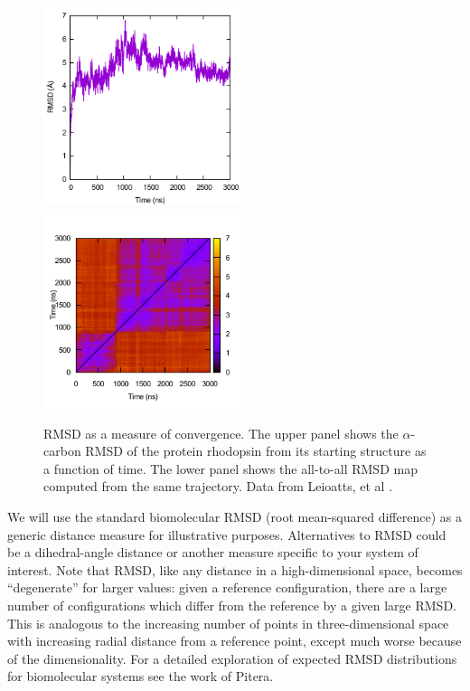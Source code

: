 \begin{figure}
  \includegraphics[width=5.8cm]{figures/rmsd/rmsd}
  \includegraphics[width=5.8cm]{figures/rmsd/rmsds}
  \caption{
  \label{f:rmsd} RMSD as a measure of convergence.  The upper panel shows the
  $\alpha$-carbon RMSD of the protein rhodopsin from its starting structure as a
  function of time.  The lower panel shows the all-to-all RMSD map computed from the same
  trajectory.  Data from Leioatts, et al \cite{Grossfield-2015}.
  }
\end{figure}

We will use the standard biomolecular RMSD (root mean-squared difference) as a generic distance measure for illustrative purposes.
Alternatives to RMSD could be a dihedral-angle distance or another measure specific to your system of interest.
Note that RMSD, like any distance in a high-dimensional space, becomes ``degenerate'' for larger values: given a reference configuration, there are a large number of configurations which differ from the reference by a given large RMSD. This is analogous to the increasing number of points in three-dimensional space with increasing radial distance from a reference point, except much worse because of the dimensionality. For a detailed exploration of expected RMSD distributions for biomolecular systems see the work of Pitera.\citep{Pitera2014}

